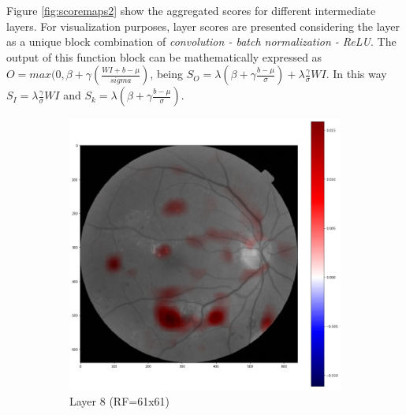 \documentclass[review]{elsarticle}
\theoremstyle{definition} %
\theoremstyle{remark}
\begin{document}
Figure \ref{fig:scoremaps2} show the aggregated scores for different intermediate layers. For visualization purposes, layer scores are presented considering the layer as a unique block combination of \emph{convolution - batch normalization - ReLU}. The output of this function block can be mathematically expressed as $O = max(0, \beta + \gamma(\frac{WI + b - \mu}{sigma})$, being $S_O = \lambda (\beta + \gamma \frac{b - \mu}{\sigma}) + \lambda \frac{\gamma}{\sigma}WI$. In this way $S_I = \lambda \frac{\gamma}{\sigma}WI$ and $S_k = \lambda (\beta + \gamma \frac{b - \mu}{\sigma})$. 

\begin{figure}[!ht]
	\centering
	\begin{subfigure}{0.45\textwidth}
		\includegraphics[width=\textwidth]{./figures/maps/rf61c.png}
		\caption{Layer 8 (RF=61x61)}
		\label{fig:score_rf61}
	\end{subfigure}
	~ %
	\begin{subfigure}{0.45\textwidth}

\end{subfigure}
\end{figure}
\end{document}
